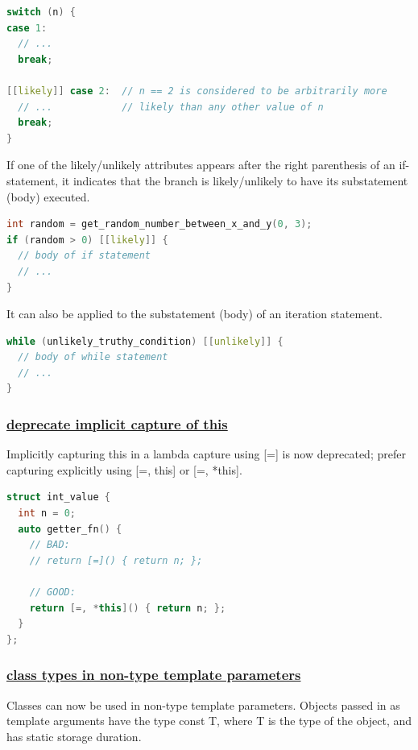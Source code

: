 \begin{lstlisting}[language=C++]
switch (n) {
case 1:
  // ...
  break;

[[likely]] case 2:  // n == 2 is considered to be arbitrarily more
  // ...            // likely than any other value of n
  break;
}
\end{lstlisting}

If one of the likely/unlikely attributes appears after the right parenthesis of an if-statement, it indicates that the branch is likely/unlikely to have its substatement (body) executed.

\begin{lstlisting}[language=C++]
int random = get_random_number_between_x_and_y(0, 3);
if (random > 0) [[likely]] {
  // body of if statement
  // ...
}
\end{lstlisting}

It can also be applied to the substatement (body) of an iteration statement.

\begin{lstlisting}[language=C++]
while (unlikely_truthy_condition) [[unlikely]] {
  // body of while statement
  // ...
}
\end{lstlisting}

\subsubsection{\href{https://github.com/AnthonyCalandra/modern-cpp-features/tree/master\#deprecate-implicit-capture-of-this}
                    {deprecate implicit capture of this}}
Implicitly capturing this in a lambda capture using [=] is now deprecated; prefer capturing explicitly using [=, this] or [=, *this].

\begin{lstlisting}[language=C++]
struct int_value {
  int n = 0;
  auto getter_fn() {
    // BAD:
    // return [=]() { return n; };

    // GOOD:
    return [=, *this]() { return n; };
  }
};
\end{lstlisting}

\subsubsection{\href{https://github.com/AnthonyCalandra/modern-cpp-features/tree/master\#class-types-in-non-type-template-parameters}
                    {class types in non-type template parameters}}
Classes can now be used in non-type template parameters. Objects passed in as template arguments have the type const T, where T is the type of the object, and has static storage duration.

